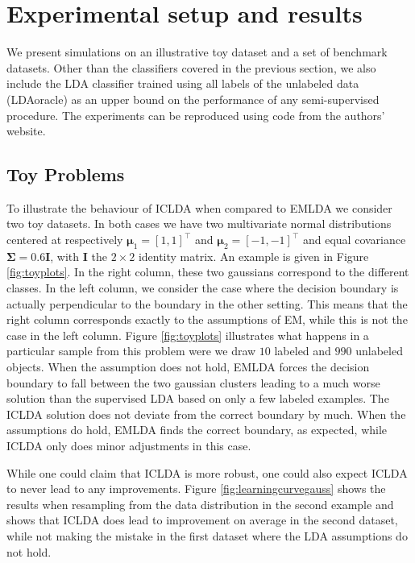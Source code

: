 \documentclass[twoside]{memoir}\usepackage[]{graphicx}\usepackage{xcolor}
\begin{document}
\section{Experimental setup and results}
We present simulations on an illustrative toy dataset and a set of benchmark datasets. Other than the classifiers covered in the previous section, we also include the LDA classifier trained using all labels of the unlabeled data (LDAoracle) as an upper bound on the performance of any semi-supervised procedure. The experiments can be reproduced using code from the authors' website. 

\subsection{Toy Problems}
To illustrate the behaviour of ICLDA when compared to EMLDA we consider two toy datasets. In both cases we have two multivariate normal distributions centered at respectively $\boldsymbol{\mu}_1=[1,1]^\top$ and $\boldsymbol{\mu}_2=[-1,-1]^\top$ and equal covariance $\mathbf{\Sigma}=0.6 \mathbf{I}$, with $\mathbf{I}$ the $2 \times 2$ identity matrix. An example is given in Figure \ref{fig:toyplots}. In the right column, these two gaussians correspond to the different classes. In the left column, we consider the case where the decision boundary is actually perpendicular to the boundary in the other setting. This means that the right column corresponds exactly to the assumptions of EM, while this is not the case in the left column. Figure \ref{fig:toyplots} illustrates what happens in a particular sample from this problem were we draw $10$ labeled and $990$ unlabeled objects. When the assumption does not hold, EMLDA forces the decision boundary to fall between the two gaussian clusters leading to a much worse solution than the supervised LDA based on only a few labeled examples. The ICLDA solution does not deviate from the correct boundary by much. When the assumptions do hold, EMLDA finds the correct boundary, as expected, while ICLDA only does minor adjustments in this case. 

While one could claim that ICLDA is more robust, one could also expect ICLDA to never lead to any improvements. Figure \ref{fig:learningcurvegauss} shows the results when resampling from the data distribution in the second example and shows that ICLDA does lead to improvement on average in the second dataset, while not making the mistake in the first dataset where the LDA assumptions do not hold.
\end{document}
